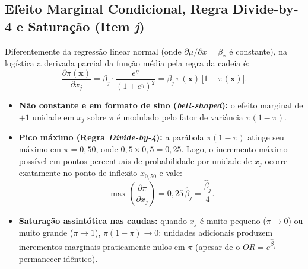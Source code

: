 \documentclass[11pt,a4paper]{article}
\begin{document}
\subsection{Efeito Marginal Condicional, Regra Divide-by-4 e Saturação (Item \textit{j})}
Diferentemente da regressão linear normal (onde $\partial \mu / \partial x = \beta_x$ é constante), na logística a derivada parcial da função média pela regra da cadeia é:
\[
  \frac{\partial \pi(\mathbf{x})}{\partial x_j}
  = \beta_j \cdot \frac{e^{\eta}}{(1+e^{\eta})^2}
  = \beta_j \,\pi(\mathbf{x})\,\big[1 - \pi(\mathbf{x})\big].
\]
\begin{itemize}[leftmargin=1.4em]
  \item \textbf{Não constante e em formato de sino (\textit{bell-shaped}):} o efeito marginal de $+1$ unidade em $x_j$ sobre $\pi$ é modulado pelo fator de variância $\pi(1-\pi)$.
  \item \textbf{Pico máximo (Regra \textit{Divide-by-4}):} a parábola $\pi(1-\pi)$ atinge seu máximo em $\pi = 0{,}50$, onde $0{,}5\times 0{,}5 = 0{,}25$. Logo, o incremento máximo possível em pontos percentuais de probabilidade por unidade de $x_j$ ocorre exatamente no ponto de inflexão $x_{0{,}50}$ e vale:
  \[
    \max\left(\frac{\partial \pi}{\partial x_j}\right) = 0{,}25\,\hat{\beta}_j = \frac{\hat{\beta}_j}{4}.
  \]
  \item \textbf{Saturação assintótica nas caudas:} quando $x_j$ é muito pequeno ($\pi \to 0$) ou muito grande ($\pi \to 1$), $\pi(1-\pi) \to 0$: unidades adicionais produzem incrementos marginais praticamente nulos em $\pi$ (apesar de o $OR = e^{\hat{\beta}_j}$ permanecer idêntico).
\end{itemize}
\end{document}

